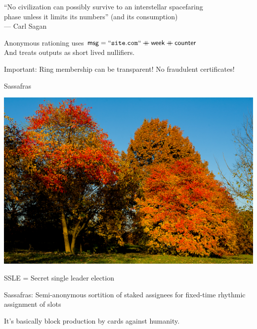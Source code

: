 \documentclass{beamer}
\begin{document}
\begin{frame}

``No civilization can possibly survive to an interstellar spacefaring \\ \smallskip
\hspace{1pt} phase unless it limits its numbers'' (and its consumption) \\ \medskip
--- Carl Sagan

\pause\bigskip\bigskip 

Anonymous rationing uses $\mathsf{msg} = \mathtt{``site.com``} \mathbin{+\mkern-10mu+} \mathsf{week} \mathbin{+\mkern-10mu+} \mathsf{counter}$ \\
\hspace{1pt} And treats outputs as short lived nullifiers.

\pause\bigskip\bigskip 

Important: Ring membership can be transparent!  No fraudulent certificates!

\end{frame}



\begin{frame}{Sassafras}

\includegraphics[width=\textwidth]{Sassafras-albidum.jpg}

\end{frame}



\begin{frame}

SSLE = Secret single leader election

\bigskip\bigskip

Sassafras: Semi-anonymous sortition of staked assignees for fixed-time rhythmic assignment of slots

\pause\bigskip\bigskip

It's basically block production by cards against humanity.

\end{frame}



\begin{frame}
\end{frame}
\end{document}
